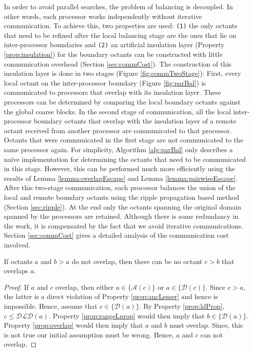 In order to avoid parallel searches, the problem of balancing is
decoupled. In other words, each processor works independently without
iterative communication. To achieve this, two properties are used:
{\tt(1)} the only octants that need to be refined after the local
balancing stage are the ones that lie on inter-processor
boundaries and {\tt(2)} an artificial insulation layer (Property
\ref{prop:insulation}) for the boundary octants can be constructed
with little communication overhead (Section \ref{sec:commCost}). The
construction of this insulation layer is done in two stages (Figure
\ref{fig:commTwoStage}): First, every local octant on the
inter-processor boundary (Figure \ref{fig:parBal}) is communicated to
processors that overlap with its insulation layer. These processors
can be determined by comparing the local boundary octants against the
global coarse blocks. In the second stage of communication, all the
local inter-processor boundary octants that overlap with the
insulation layer of a remote octant received from another processor
are communicated to that processor. Octants that were communicated in
the first stage are not communicated to the same processor again. For
simplicity, Algorithm \ref{alg:parBal} only describes a na{\"{i}}ve
implementation for determining the octants that need to be communicated in this stage. However, this can be performed
much more efficiently using the results of Lemma
\ref{lemma:overlapEscape} and Lemma \ref{lemma:pairwiseEscape}. After
this two-stage communication, each processor balances the union of the
local and remote boundary octants using the ripple propagation based
method (Section \ref{sec:ripple}). At the end only the octants
spanning the original domain spanned by the processors are
retained. Although there is some redundancy in the work, it is
compensated by the fact that we avoid iterative
communications. Section \ref{sec:commCost} gives a detailed analysis
of the communication cost involved.

\begin{lemma}
If octants $a$ and $b > a$ do not overlap, then there can be no octant $c > b$ that overlaps $a$.
\label{lemma:overlapEscape}
\end{lemma}

\begin{proof}
If $a$ and $c$ overlap, then either $a \in \{\mathcal{A}(c)\}$ or $a
\in \{\mathcal{D}(c)\}$. Since $c > a$, the latter is a direct
violation of Property \ref{prop:ancLesser} and hence is
impossible. Hence, assume that $c \in \{\mathcal{D}(a)\}$. By Property
\ref{prop:ldProp}, $c \leq \mathcal{DLD}(a)$. Property
\ref{prop:rangeLprop} would then imply that $b \in
\{\mathcal{D}(a)\}$. Property \ref{prop:overlap} would then imply that
$a$ and $b$ must overlap. Since, this is not true our initial
assumption must be wrong. Hence, $a$ and $c$ can not overlap.
\end{proof}

